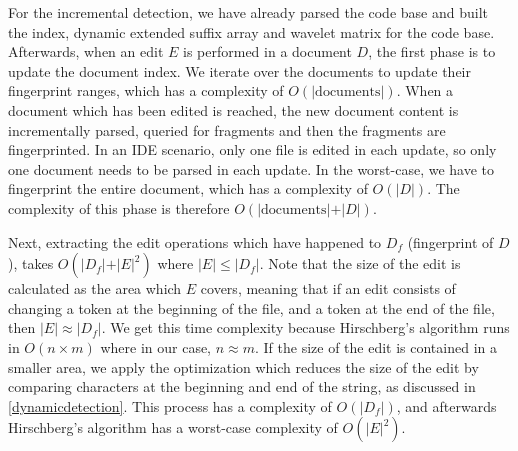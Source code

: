 For the incremental detection, we have already parsed the code base and built the index,
dynamic extended suffix array and wavelet matrix for the code base. Afterwards, when an
edit $E$ is performed in a document $D$, the first phase is to update the document index.
We iterate over the documents to update their fingerprint ranges, which has a complexity
of $O(\vert\text{documents}\vert)$. When a document which has been edited is reached, the
new document content is incrementally parsed, queried for fragments and then the fragments
are fingerprinted. In an IDE scenario, only one file is edited in each update, so only one
document needs to be parsed in each update. In the worst-case, we have to fingerprint the
entire document, which has a complexity of $O(\vert D\vert)$. The complexity of this phase
is therefore $O(\vert\text{documents}\vert + \vert D\vert)$.

Next, extracting the edit operations which have happened to $D_f$ (fingerprint of $D$),
takes $O(\vert D_f\vert + \vert E\vert^2)$ where $\vert E\vert \leq \vert D_f\vert$. Note
that the size of the edit is calculated as the area which $E$ covers, meaning that if an
edit consists of changing a token at the beginning of the file, and a token at the end of
the file, then $\vert E\vert \approx \vert D_f\vert$. We get this time complexity because
Hirschberg's algorithm runs in $O(n \times m)$ where in our case, $n \approx m$. If the
size of the edit is contained in a smaller area, we apply the optimization which reduces
the size of the edit by comparing characters at the beginning and end of the string, as
discussed in \cref{dynamicdetection}. This process has a complexity of $O(\vert D_f\vert)$,
and afterwards Hirschberg's algorithm has a worst-case complexity of $O(\vert E\vert^2)$.

